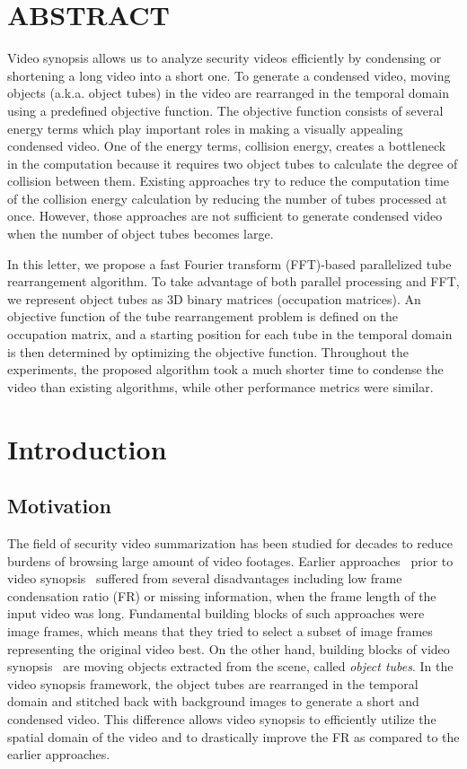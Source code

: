 \documentclass[11pt]{hyu_thesis}
\begin{document}
\tableofcontents
\newpage
\listoffigures
\newpage
\listoftables
\newpage

\section*{ABSTRACT}
Video synopsis allows us to analyze security videos efficiently by condensing or shortening a long video into a short one. To generate a condensed video, moving objects (a.k.a. object tubes) in the video are rearranged in the temporal domain using a predefined objective function. The objective function consists of several energy terms which play important roles in making a visually appealing condensed video. One of the energy terms, collision energy, creates a bottleneck in the computation because it requires two object tubes to calculate the degree of collision between them. Existing approaches try to reduce the computation time of the collision energy calculation by reducing the number of tubes processed at once. However, those approaches are not sufficient to generate condensed video when the number of object tubes becomes large.

In this letter, we propose a fast Fourier transform (FFT)-based parallelized tube rearrangement algorithm. To take advantage of both parallel processing and FFT, we represent object tubes as 3D binary matrices (occupation matrices). An objective function of the tube rearrangement problem is defined on the occupation matrix, and a starting position for each tube in the temporal domain is then determined by optimizing the objective function. Throughout the experiments, the proposed algorithm took a much shorter time to condense the video than existing algorithms, while other performance metrics were similar.
\newpage

\section{Introduction}
\label{sec:intro}
\subsection{Motivation}
The field of security video summarization has been studied for decades to reduce burdens of browsing large amount of video footages. Earlier approaches~\cite{Smith1998,Petrovic2005,Hoferlin2011} prior to video synopsis~\cite{Rav-Acha2006,Pritch2007,Pritch2008} suffered from several disadvantages including low frame condensation ratio (FR) or missing information, when the frame length of the input video was long. Fundamental building blocks of such approaches were image frames, which means that they tried to select a subset of image frames representing the original video best. On the other hand, building blocks of video synopsis~\cite{Rav-Acha2006,Pritch2007,Pritch2008} are moving objects extracted from the scene, called \textit{object tubes}. In the video synopsis framework, the object tubes are rearranged in the temporal domain and stitched back with background images to generate a short and condensed video. This difference allows video synopsis to efficiently utilize the spatial domain of the video and to drastically improve the FR as compared to the earlier approaches.
\end{document}
